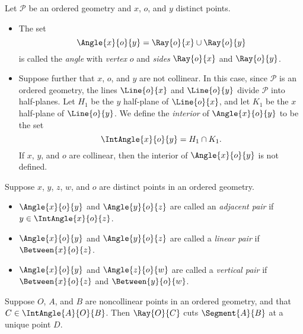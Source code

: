 \documentclass{article}
\begin{document}

\begin{dfn}[Angle]
Let $\mathcal{P}$ be an ordered geometry and $x$, $o$, and $y$ distinct points.
\begin{itemize}
\item The set \[ \Angle{x}{o}{y} = \Ray{o}{x} \cup \Ray{o}{y} \] is called the \emph{angle} with \emph{vertex} $o$ and \emph{sides} $\Ray{o}{x}$ and $\Ray{o}{y}$.
\item Suppose further that $x$, $o$, and $y$ are not collinear. In this case, since $\mathcal{P}$ is an ordered geometry, the lines $\Line{o}{x}$ and $\Line{o}{y}$ divide $\mathcal{P}$ into half-planes. Let $H_1$ be the $y$ half-plane of $\Line{o}{x}$, and let $K_1$ be the $x$ half-plane of $\Line{o}{y}$. We define the \emph{interior} of $\Angle{x}{o}{y}$ to be the set \[ \IntAngle{x}{o}{y} = H_1 \cap K_1. \] If $x$, $y$, and $o$ are collinear, then the interior of $\Angle{x}{o}{y}$ is not defined.
\end{itemize}
\end{dfn}



\begin{dfn}
Suppose $x$, $y$, $z$, $w$, and $o$ are distinct points in an ordered geometry.
\begin{itemize}
\item $\Angle{x}{o}{y}$ and $\Angle{y}{o}{z}$ are called an \emph{adjacent pair} if $y \in \IntAngle{x}{o}{z}$.
\item $\Angle{x}{o}{y}$ and $\Angle{y}{o}{z}$ are called a \emph{linear pair} if $\Between{x}{o}{z}$.
\item $\Angle{x}{o}{y}$ and $\Angle{z}{o}{w}$ are called a \emph{vertical pair} if $\Between{x}{o}{z}$ and $\Between{y}{o}{w}$.
\end{itemize}
\end{dfn}

\begin{thm}
Suppose $O$, $A$, and $B$ are noncollinear points in an ordered geometry, and that $C \in \IntAngle{A}{O}{B}$. Then $\Ray{O}{C}$ cuts $\Segment{A}{B}$ at a unique point $D$.
\end{thm}
\end{document}
